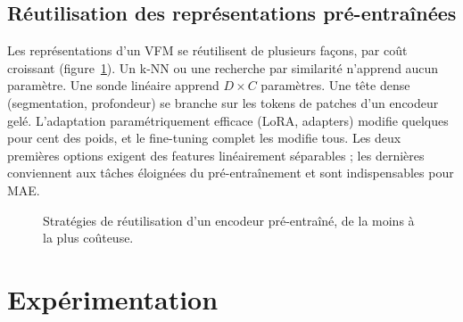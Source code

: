 \documentclass[11pt,a4paper]{article}
\begin{document}
\subsection{Réutilisation des représentations pré-entraînées}
Les représentations d'un VFM se réutilisent de plusieurs façons, par coût croissant (figure~\ref{fig:reuse}). Un k-NN ou une recherche par similarité n'apprend aucun paramètre. Une sonde linéaire apprend $D\times C$ paramètres. Une tête dense (segmentation, profondeur) se branche sur les tokens de patches d'un encodeur gelé. L'adaptation paramétriquement efficace (LoRA, adapters) modifie quelques pour cent des poids, et le fine-tuning complet les modifie tous. Les deux premières options exigent des features linéairement séparables ; les dernières conviennent aux tâches éloignées du pré-entraînement et sont indispensables pour MAE.

\begin{figure}[ht]
  \centering
  \resizebox{0.76\textwidth}{!}{}
  \caption{Stratégies de réutilisation d'un encodeur pré-entraîné, de la moins à la plus coûteuse.}
  \label{fig:reuse}
\end{figure}

\section{Expérimentation}
\end{document}
